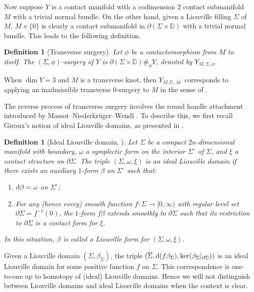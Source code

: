 \documentclass[11pt]{amsart}
\numberwithin{equation}{section}
\newtheorem{definition}[theorem]{\textbf{Definition}}
\def\D{{\mathbb D}}
\def\rd{{\rm d}}
\DeclareMathOperator{\Id}{id}
\begin{document}
Now suppose $Y$ is a contact manifold with a codimension $2$ contact submanifold $M$ with a trivial normal bundle. On the other hand, given a Liouville filling $\Sigma$ of $M$, $M\times \{0\}$ is clearly a contact submanifold in $\partial (\Sigma \times \D)$ with a trivial normal bundle. This leads to the following definition.
\begin{definition}[Transverse surgery]
Let $\phi$ be a contactomorphism from $M$ to itself. The $(\Sigma,\phi)$-surgery of $Y$ is $\partial (\Sigma \times \D)\#_\phi Y$, denoted by $Y_{M,\Sigma,\phi}$.
\end{definition}
When $\dim Y=3$ and $M$ is a transverse knot, then $Y_{M,\D,\Id}$ corresponds to applying an inadmissible transverse $0$-surgery to $M$ in the sense of \cite[\S 2.3]{zbMATH07076087}. 

The reverse process of transverse surgery involves the round handle attachment introduced by Massot--Niederkr\"uger--Wendl \cite{MNW}. To describe this, we first recall Giroux's \cite{Giroux20} notion of ideal Liouville domains, as presented in \cite{MNW}.
\begin{definition}[Ideal Liouville domain, {\cite[\S 4.2]{MNW}}]
Let $\Sigma$ be a compact $2n$-dimensional manifold with boundary, $\omega$ a symplectic form on the interior $\Sigma^\circ$ of $\Sigma$, and $\xi$ a contact structure on $\partial \Sigma$. The triple $(\Sigma, \omega, \xi)$ is an ideal Liouville domain if there exists an auxiliary $1$-form $\beta$ on $\Sigma^\circ$ such that:
\begin{enumerate}
    \item $\rd \beta = \omega$ on $\Sigma^{\circ}$;
    \item For any (hence every) smooth function $f:\Sigma \to [0, \infty)$ with regular level set $\partial \Sigma= f^{-1}(0)$, the $1$-form $f\beta$ extends smoothly to $\partial \Sigma$ such that its restriction to $\partial \Sigma$ is a contact form for $\xi$.
\end{enumerate}
In this situation, $\beta$ is called a Liouville form for $(\Sigma, \omega, \xi)$.
\end{definition}
Given a Liouville domain $(\Sigma,\beta_{\Sigma})$, the triple $(\overline{\Sigma},\rd(f\beta_{\Sigma}),\ker(\beta_{\Sigma}|_{\partial \Sigma}))$ is an ideal Liouville domain for some positive function $f$ on $\Sigma$. This correspondence is one-to-one up to homotopy of (ideal) Liouville domains. Hence we will not distinguish between Liouville domains and ideal Liouville domains when the context is clear.
\end{document}
